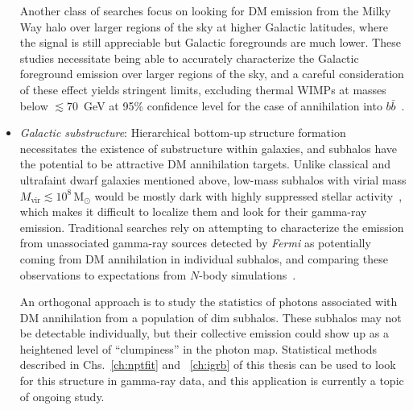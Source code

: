 \begin{itemize}
Another class of searches focus on looking for DM emission from the Milky Way halo over larger regions of the sky at higher Galactic latitudes, where the signal is still appreciable but Galactic foregrounds are much lower. These studies necessitate being able to accurately characterize the Galactic foreground emission over larger regions of the sky, and a careful consideration of these effect yields stringent limits, excluding thermal WIMPs at masses below $\lesssim 70$~GeV at 95\% confidence level for the case of annihilation into $b\bar b$~\cite{Chang:2018bpt}.

\item \emph{Galactic substructure}: Hierarchical bottom-up structure formation necessitates the existence of substructure within galaxies, and subhalos have the potential to be attractive DM annihilation targets. Unlike classical and ultrafaint dwarf galaxies mentioned above, low-mass subhalos with virial mass $M_\mathrm{vir}\lesssim 10^8$\,M$_\odot$ would be mostly dark with highly suppressed stellar activity~\cite{2017MNRAS.467.2019R,Fitts:2016usl}, which makes it difficult to localize them and look for their gamma-ray emission. Traditional searches rely on attempting to characterize the emission from unassociated gamma-ray sources detected by \emph{Fermi} as potentially coming from DM annihilation in individual subhalos, and comparing these observations to expectations from $N$-body simulations~\cite{Bertoni:2015mla,Calore:2016ogv,Hooper:2016cld,Schoonenberg:2016aml}.

An orthogonal approach is to study the statistics of photons associated with DM annihilation from a population of dim subhalos. These subhalos may not be detectable individually, but their collective emission could show up as a heightened level of ``clumpiness'' in the photon map. Statistical methods described in Chs.~\ref{ch:nptfit} and ~\ref{ch:igrb} of this thesis can be used to look for this structure in gamma-ray data, and this application is currently a topic of ongoing study.


\end{itemize}
